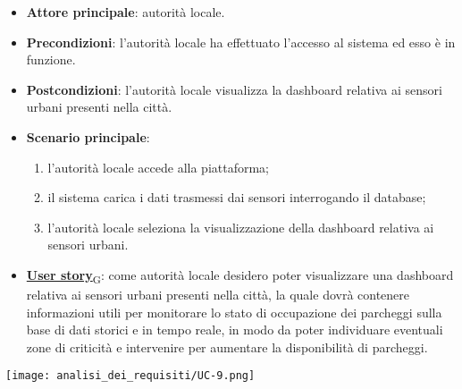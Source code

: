 \begin{itemize}
	\item \textbf{Attore principale}: autorità locale.
	\item \textbf{Precondizioni}: l'autorità locale ha effettuato l'accesso al sistema ed esso è in funzione.
	\item \textbf{Postcondizioni}: l'autorità locale visualizza la dashboard relativa
	      ai sensori urbani presenti nella città.
	\item \textbf{Scenario principale}:
	      \begin{enumerate}
		      \item l'autorità locale accede alla piattaforma;
		      \item il sistema carica i dati trasmessi dai sensori interrogando il database;
		      \item l'autorità locale seleziona la visualizzazione della dashboard relativa ai sensori urbani.
	      \end{enumerate}
	\item \href{https://7last.github.io/docs/pb/documentazione-interna/glossario\#user-story}{\textbf{User story}\textsubscript{G}}:
	      come autorità locale desidero poter visualizzare una dashboard relativa ai sensori urbani presenti nella città, la quale
	      dovrà contenere informazioni utili per monitorare lo stato di occupazione dei parcheggi sulla base di dati storici e in tempo reale,
	      in modo da poter individuare eventuali zone di criticità e intervenire per aumentare la disponibilità di parcheggi.
\end{itemize}
\begin{center}
	\texttt{[image: analisi\_dei\_requisiti/UC-9.png]}
\end{center}


